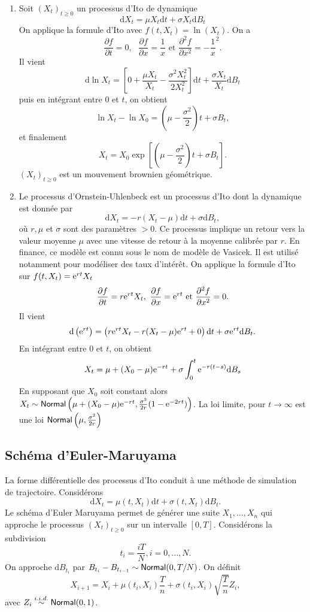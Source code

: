 \begin{ex}
\begin{enumerate}
	\item Soit $(X_t)_{t\geq 0}$ un processus d'Ito de dynamique 
	$$
	\text{d}X_t = \mu X_t\text{d}t+\sigma X_t\text{d}B_t
	$$
	On applique la formule d'Ito avec $f(t, X_t) = \ln(X_t)$. On a 
	$$
	\frac{\partial f}{\partial t} = 0,\text{ }\frac{\partial f}{\partial x} = \frac 1x\text{ et }\frac{\partial^2 f}{\partial x^2} = -\frac{1}{x}^2.
	$$
	Il vient 
	$$
	\text{d}\ln X_t = \left[0+\frac{\mu X_t}{X_t} - \frac{\sigma^2X_t^2}{2X_t^2}\right]\text{d}t +\frac{\sigma X_t}{X_t}\text{d}B_t
	$$
	puis en intégrant entre $0$ et $t$, on obtient 
	$$
	\ln X_t - \ln X_0 = \left(\mu - \frac{\sigma^2}{2}\right)t + \sigma B_t,
	$$
	et finalement 
	$$
	X_t = X_0\exp\left[\left(\mu - \frac{\sigma^2}{2}\right)t + \sigma B_t\right].
	$$
	$(X_t)_{t\geq 0}$ est un mouvement brownien géométrique.
	\item Le processus d'Ornstein-Uhlenbeck est un processus d'Ito dont la dynamique est donnée par 
	$$
	\text{d}X_t = -r(X_t - \mu)\text{d}t + \sigma\text{d}B_t,
	$$
	où $r,\mu$ et $\sigma$ sont des paramètres $>0$. Ce processus implique un retour vers la valeur moyenne $\mu$ avec une vitesse de retour à la moyenne calibrée par $r$. En finance, ce modèle est connu sous le nom de modèle de Vasicek. Il est utilisé notamment pour modéliser des taux d'intérêt. On applique la formule d'Ito sur $f(t, X_t) = \mathrm{e}^{rt}X_t$
	$$
	\frac{\partial f}{\partial t} = r\mathrm{e}^{rt}X_t,\text{ }\frac{\partial f}{\partial x} = \mathrm{e}^{rt}\text{ et }\frac{\partial^2 f}{\partial x^2} = 0.
	$$
	Il vient 
	$$
	\text{d}\left(\mathrm{e}^{rt}\right) = \left(r\mathrm{e}^{rt}X_t - r(X_t - \mu)\mathrm{e}^{rt}+0\right)\text{d}t + \sigma\mathrm{e}^{rt}\text{d}B_t.
	$$
	En intégrant entre $0$ et $t$, on obtient 
	$$
	X_t = \mu + (X_0 - \mu)\mathrm{e}^{-rt} + \sigma \int_0^t\mathrm{e}^{-r(t-s)}\text{d}B_s
	$$
	En supposant que $X_0$ soit constant alors $X_t \sim\mathsf{Normal}\left(\mu + (X_0 - \mu)\mathrm{e}^{-rt}, \frac{\sigma^2}{2r}(1-\mathrm{e}^{-2rt})\right)$. La loi limite, pour $t\rightarrow \infty$ est une loi $\mathsf{Normal}\left(\mu, \frac{\sigma^2}{2r}\right)$
\end{enumerate}
\end{ex}
\subsection{Schéma d'Euler-Maruyama}
La forme différentielle des processus d'Ito conduit à une méthode de simulation de trajectoire. Considérons 
$$
\text{d}X_t = \mu(t,X_t)\text{d}t+ \sigma(t, X_t)\text{d}B_t.
$$
Le schéma d'Euler Maruyama permet de générer une suite $X_1,\ldots, X_n$ qui approche le processus $(X_t)_{t\geq 0}$ sur un intervalle $[0, T]$. Considérons la subdivision 
$$
t_i = \frac{iT}{N}, i = 0,\ldots, N.
$$
On approche $\text{d}B_{t_{i}}$ par $B_{t_{i}} - B_{t_{i-1}}\sim\mathsf{Normal}(0, T/N)$. On définit 
$$
X_{i+1} = X_i + \mu(t_i, X_i)\frac{T}{n} + \sigma(t_i, X_i)\sqrt{\frac{T}{n}}Z_i,
$$
avec $Z_i\overset{i.i.d.}{\sim} \mathsf{Normal}(0,1)$.
